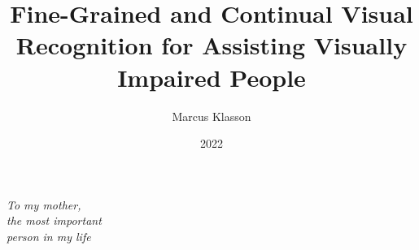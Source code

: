 \documentclass[electronic, oldfontcommands]{kthesis}
\newlength\longest %
\begin{document}
	
\setlength{\abovedisplayskip}{3pt} 
\setlength{\belowdisplayskip}{3pt}
	
\newcommand*{\BuildingFromMainFile}{}
	
\title{Fine-Grained and Continual Visual Recognition for Assisting Visually Impaired People}
\author{Marcus Klasson}
\date{2022}
\address{Division of Robotics, Perception, and Learning \\ School of Electrical Engineering and Computer Science\\ KTH Royal Institute of Technology \\ SE-100 44 Stockholm, Sweden}
	
\maketitle

\thispagestyle{empty}
\null\vfill 
\clearpage

\clearpage

\thispagestyle{empty}
\null\vfill %

\settowidth{}
\begin{center}
\parbox{\longest}{%
	\begin{center}
	\huge\itshape To my mother,\\
	the most important\\
	person in my life\par\bigskip 
	\end{center}
}
\end{center}

\vfill\vfill

\clearpage

\thispagestyle{empty}
\null\vfill 
\clearpage
\end{document}
